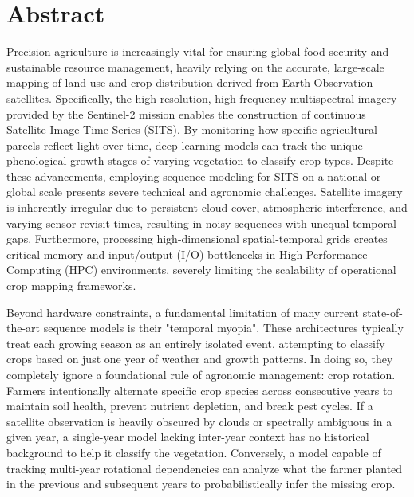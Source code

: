 \chapter*{Abstract}
\label{cha:abstract}

Precision agriculture is increasingly vital for ensuring global food security and sustainable resource management,
heavily relying on the accurate, large-scale mapping of land use and crop distribution derived from Earth Observation satellites.
Specifically, the high-resolution, high-frequency multispectral imagery provided by the Sentinel-2 mission enables
the construction of continuous Satellite Image Time Series (SITS).
By monitoring how specific agricultural parcels reflect light over time, deep learning models can track the
unique phenological growth stages of varying vegetation to classify crop types.
Despite these advancements, employing sequence modeling for SITS on a national or
global scale presents severe technical and agronomic challenges.
Satellite imagery is inherently irregular due to persistent cloud cover, atmospheric interference,
and varying sensor revisit times, resulting in noisy sequences with unequal temporal gaps.
Furthermore, processing high-dimensional spatial-temporal grids creates critical memory and
input/output (I/O) bottlenecks in High-Performance Computing (HPC) environments,
severely limiting the scalability of operational crop mapping frameworks.

Beyond hardware constraints, a fundamental limitation of many current
state-of-the-art sequence models is their "temporal myopia".
These architectures typically treat each growing season as an entirely isolated event,
attempting to classify crops based on just one year of weather and growth patterns.
In doing so, they completely ignore a foundational rule of agronomic management: crop rotation.
Farmers intentionally alternate specific crop species across consecutive years to maintain soil health,
prevent nutrient depletion, and break pest cycles.
If a satellite observation is heavily obscured by clouds or spectrally ambiguous in a given year,
a single-year model lacking inter-year context has no historical background to help it classify the vegetation.
Conversely, a model capable of tracking multi-year rotational dependencies can analyze what the farmer
planted in the previous and subsequent years to probabilistically infer the missing crop.

